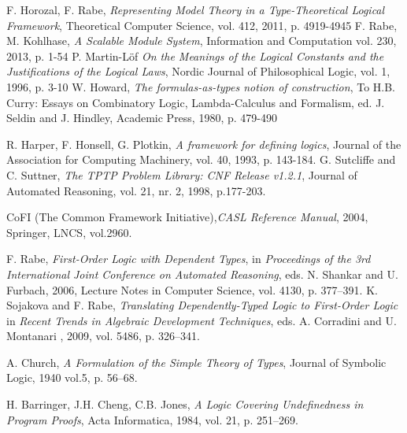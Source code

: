 \documentclass{article}
\begin{document}
\begin{thebibliography}{10}
 F. Horozal, F. Rabe, \textit{Representing Model Theory in a Type-Theoretical Logical Framework}, Theoretical Computer Science, vol. 412, 2011, p. 4919-4945 
 F. Rabe, M. Kohlhase, \textit{A Scalable Module System}, Information and Computation vol. 230, 2013, p. 1-54
  P. Martin-L{\"o}f \textit{On the Meanings of the Logical Constants and the Justifications of the Logical Laws},
 Nordic Journal of Philosophical Logic, vol. 1, 1996, p. 3-10
 W. Howard, \textit{The formulas-as-types notion of construction}, To H.B. Curry: Essays on Combinatory Logic, Lambda-Calculus and Formalism, ed. J. Seldin and J. Hindley, Academic Press, 1980, p. 479-490

 R. Harper, F. Honsell, G. Plotkin, \textit{A framework for defining logics}, Journal of the Association for Computing Machinery,
  vol. 40, 1993,  p. 143-184.
G. Sutcliffe and C. Suttner,
        \textit{The {TPTP} Problem Library: CNF Release v1.2.1},
    Journal of Automated Reasoning, vol. 21, nr. 2, 1998, p.177-203.
    
 CoFI (The Common Framework Initiative),\textit{CASL Reference Manual}, 2004, Springer, LNCS, vol.2960.

 F. Rabe, \textit{First-Order Logic with Dependent Types}, in \textit{Proceedings of the 3rd International Joint Conference on Automated Reasoning},
 eds. N. Shankar and U. Furbach, 2006, Lecture Notes in Computer Science,
 vol. 4130,
 p. 377--391.
 K. Sojakova and F. Rabe,
 \textit{Translating Dependently-Typed Logic to First-Order Logic} in \textit{Recent Trends in Algebraic Development Techniques}, eds. A. Corradini and U. Montanari , 2009,
 vol. 5486, p. 326--341.

 A. Church, \textit{A Formulation of the Simple Theory of Types}, Journal of Symbolic Logic, 1940 vol.5, p. 56--68.

 H. Barringer, J.H. Cheng, C.B. Jones, \textit{A Logic Covering Undefinedness in Program Proofs}, Acta Informatica, 1984, vol. 21, p. 251--269.

\end{thebibliography}
\end{document}
